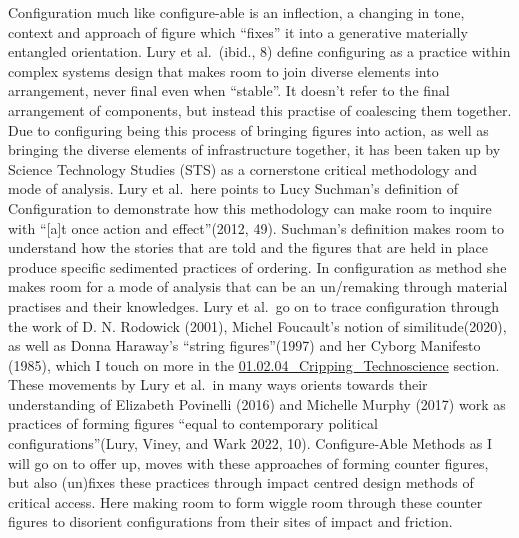 Configuration much like configure-able is an inflection, a changing in
tone, context and approach of figure which ``fixes'' it into a
generative materially entangled orientation. Lury et al.~(ibid., 8)
define configuring as a practice within complex systems design that
makes room to join diverse elements into arrangement, never final even
when ``stable''. It doesn't refer to the final arrangement of
components, but instead this practise of coalescing them together. Due
to configuring being this process of bringing figures into action, as
well as bringing the diverse elements of infrastructure together, it has
been taken up by Science Technology Studies (STS) as a cornerstone
critical methodology and mode of analysis. Lury et al.~here points to
Lucy Suchman's definition of Configuration to demonstrate how this
methodology can make room to inquire with ``{[}a{]}t once action and
effect''(2012, 49). Suchman's definition makes room to understand how
the stories that are told and the figures that are held in place produce
specific sedimented practices of ordering. In configuration as method
she makes room for a mode of analysis that can be an un/remaking through
material practises and their knowledges. Lury et al.~go on to trace
configuration through the work of D. N. Rodowick (2001), Michel
Foucault's notion of similitude(2020), as well as Donna Haraway's
``string figures''(1997) and her Cyborg Manifesto (1985), which I touch
on more in the
\href{../../01_Disability_justice_and_life_affirmation_flipping_the_table/sections/01.02.04_Cripping_Technoscience.md}{01.02.04\_Cripping\_Technoscience}
section. These movements by Lury et al.~in many ways orients towards
their understanding of Elizabeth Povinelli (2016) and Michelle Murphy
(2017) work as practices of forming figures ``equal to contemporary
political configurations''(Lury, Viney, and Wark 2022, 10).
Configure-Able Methods as I will go on to offer up, moves with these
approaches of forming counter figures, but also (un)fixes these
practices through impact centred design methods of critical access. Here
making room to form wiggle room through these counter figures to
disorient configurations from their sites of impact and friction.

